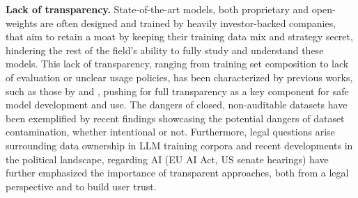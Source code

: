 \textbf{Lack of transparency.}
State-of-the-art models, both proprietary and open-weights are often designed and trained by heavily investor-backed companies, that aim to retain a moat by keeping their training data mix and strategy secret, hindering the rest of the field's ability to fully study and understand these models. 
This lack of transparency, ranging from training set composition to lack of evaluation or unclear usage policies, has been characterized by previous works, such as those by  and , pushing for full transparency as a key component for safe model development and use. 
The dangers of closed, non-auditable datasets have been exemplified by recent findings showcasing the potential dangers of dataset contamination, whether intentional  or not. Furthermore, legal questions arise surrounding data ownership in LLM training corpora  and recent developments in the political landscape, regarding AI (EU AI Act, US senate hearings) have further emphasized the importance of transparent approaches, both from a legal perspective and to build user trust. 

